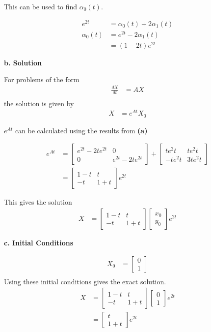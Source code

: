 \documentclass[a4paper,11pt]{article}
\begin{document}
This can be used to find $\alpha_0(t)$.

\begin{align*}
e^{2 t} &= \alpha_0(t) + 2\alpha_1(t)\\
\alpha_0(t) &= e^{2 t} - 2\alpha_1(t)\\
&= (1 - 2t)e^{2t}
\end{align*}

\textbf{b. Solution}

For problems of the form
\begin{align*}
\frac{dX}{dt} &= AX\\
\end{align*}
the solution is given by
\begin{align*}
X &= e^{At}X_0
\end{align*}

$e^{At}$ can be calculated using the results from \textbf{(a)}

\begin{align*}
e^{At} &=
\begin{bmatrix}
e^{2t} - 2te^{2t} & 0 \\
0 & e^{2t} - 2te^{2t}
\end{bmatrix} +
\begin{bmatrix}
te^2t & te^2t\\
-te^2t & 3te^2t
\end{bmatrix}\\
&= \begin{bmatrix}
1 - t & t \\
-t & 1 + t
\end{bmatrix} e^{2t}
\end{align*}

This gives the solution
\begin{align*}
X &= \begin{bmatrix}
1 - t & t \\
-t & 1 + t
\end{bmatrix}\begin{bmatrix}
x_0\\
y_0
\end{bmatrix}  e^{2t}
\end{align*}

\textbf{c. Initial Conditions}

\begin{align*}
X_0 &= \begin{bmatrix}
0 \\
1
\end{bmatrix}\\
\end{align*}
Using these initial conditions gives the exact solution.
\begin{align*}
X &= \begin{bmatrix}
1 - t & t \\
-t & 1 + t
\end{bmatrix}\begin{bmatrix}
0 \\
1
\end{bmatrix} e^{2t}\\
&= \begin{bmatrix}
t\\
1 + t
\end{bmatrix} e^{2t}
\end{align*}
\end{document}
